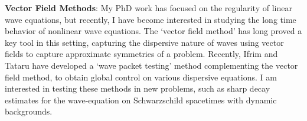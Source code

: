 \documentclass[11pt]{article}
\DeclareMathOperator{\RR}{\mathbb{R}}
\begin{document}



{\bf Vector Field Methods}: My PhD work has focused on the regularity of linear wave equations, but recently, I have become interested in studying the long time behavior of nonlinear wave equations. The `vector field method' has long proved a key tool in this setting, capturing the dispersive nature of waves using vector fields to capture approximate symmetries of a problem. Recently, Ifrim and Tataru \cite{IfrimTataruWaterWaves} have developed a `wave packet testing' method complementing the vector field method, to obtain global control on various dispersive equations. I am interested in testing these methods in new problems, such as sharp decay estimates for the wave-equation on Schwarzschild spacetimes with dynamic backgrounds.
\end{document}
